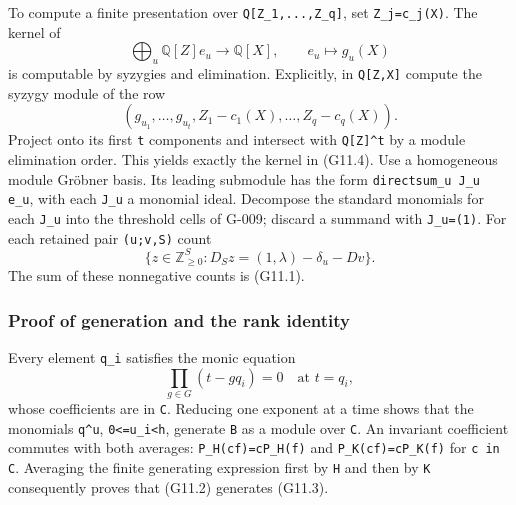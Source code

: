 \documentclass[
  10pt,
]{article}
\begin{document}
To compute a finite presentation over
\texttt{\small Q[\allowbreak{}Z\_\allowbreak{}1,\allowbreak{}...,\allowbreak{}Z\_\allowbreak{}q]\allowbreak{}},
set
\texttt{\small Z\_\allowbreak{}j=\allowbreak{}c\_\allowbreak{}j(\allowbreak{}X)\allowbreak{}}.
The kernel of \[
\bigoplus_u\mathbb Q[Z]e_u\longrightarrow\mathbb Q[X],
\qquad e_u\longmapsto g_u(X)
\tag{G11.4}
\] is computable by syzygies and elimination. Explicitly, in
\texttt{\small Q[\allowbreak{}Z,\allowbreak{}X]\allowbreak{}} compute
the syzygy module of the row \[
(g_{u_1},\ldots,g_{u_t},Z_1-c_1(X),\ldots,Z_q-c_q(X)).
\] Project onto its first \texttt{\small t} components and intersect
with \texttt{\small Q[\allowbreak{}Z]\allowbreak{}\textasciicircum{}t}
by a module elimination order. This yields exactly the kernel in
(G11.4). Use a homogeneous module Gröbner basis. Its leading submodule
has the form
\texttt{\small directsum\_\allowbreak{}u J\_\allowbreak{}u e\_\allowbreak{}u},
with each \texttt{\small J\_\allowbreak{}u} a monomial ideal. Decompose
the standard monomials for each \texttt{\small J\_\allowbreak{}u} into
the threshold cells of G-009; discard a summand with
\texttt{\small J\_\allowbreak{}u=\allowbreak{}(\allowbreak{}1)\allowbreak{}}.
For each retained pair
\texttt{\small (\allowbreak{}u;\allowbreak{}v,\allowbreak{}S)\allowbreak{}}
count \[
\{z\in\mathbb Z_{\ge0}^{S}:
D_Sz=(1,\lambda)-\delta_u-Dv\}.
\tag{G11.5}
\] The sum of these nonnegative counts is (G11.1).

\subsubsection{Proof of generation and the rank
identity}\label{proof-of-generation-and-the-rank-identity}

Every element \texttt{\small q\_\allowbreak{}i} satisfies the monic
equation \[
\prod_{g\in G}(t-gq_i)=0\quad\text{at }t=q_i,
\] whose coefficients are in \texttt{\small C}. Reducing one exponent at
a time shows that the monomials \texttt{\small q\textasciicircum{}u},
\texttt{\small 0<=\allowbreak{}u\_\allowbreak{}i<h}, generate
\texttt{\small B} as a module over \texttt{\small C}. An invariant
coefficient commutes with both averages:
\texttt{\small P\_\allowbreak{}H(\allowbreak{}cf)\allowbreak{}=\allowbreak{}cP\_\allowbreak{}H(\allowbreak{}f)\allowbreak{}}
and
\texttt{\small P\_\allowbreak{}K(\allowbreak{}cf)\allowbreak{}=\allowbreak{}cP\_\allowbreak{}K(\allowbreak{}f)\allowbreak{}}
for \texttt{\small c in C}. Averaging the finite generating expression
first by \texttt{\small H} and then by \texttt{\small K} consequently
proves that (G11.2) generates (G11.3).
\end{document}
